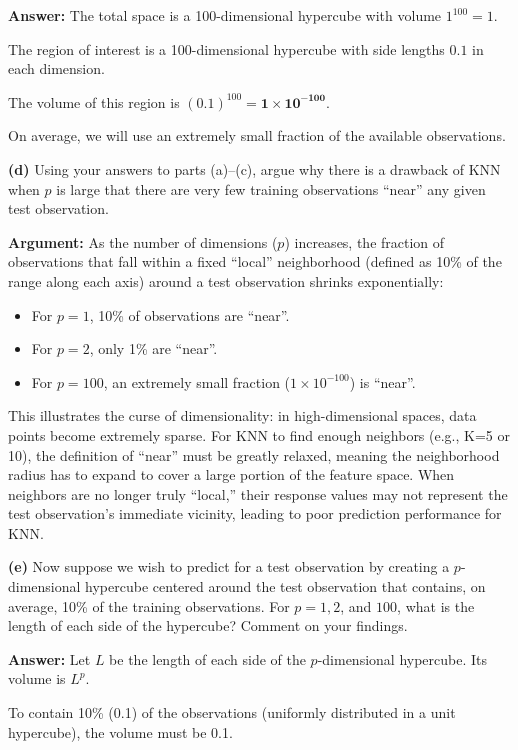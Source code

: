 \documentclass[
]{article}
\providecommand{\tightlist}{%
  \setlength{\itemsep}{0pt}\setlength{\parskip}{0pt}}
\begin{document}
\textbf{Answer:} The total space is a 100-dimensional hypercube with
volume \(1^{100} = 1\).

The region of interest is a 100-dimensional hypercube with side lengths
\(0.1\) in each dimension.

The volume of this region is
\((0.1)^{100} = \mathbf{1 \times 10^{-100}}\).

On average, we will use an extremely small fraction of the available
observations.

\textbf{(d)} Using your answers to parts (a)--(c), argue why there is a
drawback of KNN when \(p\) is large that there are very few training
observations ``near'' any given test observation.

\textbf{Argument:} As the number of dimensions (\(p\)) increases, the
fraction of observations that fall within a fixed ``local'' neighborhood
(defined as 10\% of the range along each axis) around a test observation
shrinks exponentially:

\begin{itemize}
\tightlist
\item
  For \(p=1\), 10\% of observations are ``near''.
\item
  For \(p=2\), only 1\% are ``near''.
\item
  For \(p=100\), an extremely small fraction (\(1 \times 10^{-100}\)) is
  ``near''.
\end{itemize}

This illustrates the curse of dimensionality: in high-dimensional
spaces, data points become extremely sparse. For KNN to find enough
neighbors (e.g., K=5 or 10), the definition of ``near'' must be greatly
relaxed, meaning the neighborhood radius has to expand to cover a large
portion of the feature space. When neighbors are no longer truly
``local,'' their response values may not represent the test
observation's immediate vicinity, leading to poor prediction performance
for KNN.

\textbf{(e)} Now suppose we wish to predict for a test observation by
creating a \(p\)-dimensional hypercube centered around the test
observation that contains, on average, 10\% of the training
observations. For \(p = 1, 2\), and \(100\), what is the length of each
side of the hypercube? Comment on your findings.

\textbf{Answer:} Let \(L\) be the length of each side of the
\(p\)-dimensional hypercube. Its volume is \(L^p\).

To contain 10\% (0.1) of the observations (uniformly distributed in a
unit hypercube), the volume must be 0.1.
\end{document}
